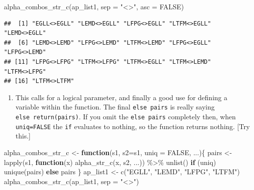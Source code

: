 \documentclass[
]{book}
\newenvironment{Shaded}{\begin{snugshade}}{\end{snugshade}}
\newcommand{\AttributeTok}[1]{\textcolor[rgb]{0.77,0.63,0.00}{#1}}
\newcommand{\ConstantTok}[1]{\textcolor[rgb]{0.00,0.00,0.00}{#1}}
\newcommand{\ControlFlowTok}[1]{\textcolor[rgb]{0.13,0.29,0.53}{\textbf{#1}}}
\newcommand{\FunctionTok}[1]{\textcolor[rgb]{0.00,0.00,0.00}{#1}}
\newcommand{\NormalTok}[1]{#1}
\newcommand{\OtherTok}[1]{\textcolor[rgb]{0.56,0.35,0.01}{#1}}
\newcommand{\SpecialCharTok}[1]{\textcolor[rgb]{0.00,0.00,0.00}{#1}}
\newcommand{\StringTok}[1]{\textcolor[rgb]{0.31,0.60,0.02}{#1}}
\providecommand{\tightlist}{%
  \setlength{\itemsep}{0pt}\setlength{\parskip}{0pt}}
\begin{document}
\begin{Shaded}
\begin{Highlighting}[]
\FunctionTok{alpha\_combos\_str\_c}\NormalTok{(ap\_list1, }\AttributeTok{sep =} \StringTok{"\textless{}\textgreater{}"}\NormalTok{, }\AttributeTok{asc =} \ConstantTok{FALSE}\NormalTok{)}
\end{Highlighting}
\end{Shaded}

\begin{verbatim}
##  [1] "EGLL<>EGLL" "LEMD<>EGLL" "LFPG<>EGLL" "LTFM<>EGLL" "LEMD<>EGLL"
##  [6] "LEMD<>LEMD" "LFPG<>LEMD" "LTFM<>LEMD" "LFPG<>EGLL" "LFPG<>LEMD"
## [11] "LFPG<>LFPG" "LTFM<>LFPG" "LTFM<>EGLL" "LTFM<>LEMD" "LTFM<>LFPG"
## [16] "LTFM<>LTFM"
\end{verbatim}

\begin{enumerate}
\def\labelenumi{\arabic{enumi})}
\setcounter{enumi}{8}
\tightlist
\item
  This calls for a logical parameter, and finally a good use for defining a variable within the function. The final \texttt{else\ pairs} is really saying \texttt{else\ return(pairs)}. If you omit the \texttt{else\ pairs} completely then, when \texttt{uniq=FALSE} the \texttt{if} evaluates to nothing, so the function returns nothing. {[}Try this.{]}
\end{enumerate}

\begin{Shaded}
\begin{Highlighting}[]
\NormalTok{alpha\_combos\_str\_c }\OtherTok{\textless{}{-}} \ControlFlowTok{function}\NormalTok{(s1, }\AttributeTok{s2=}\NormalTok{s1, }\AttributeTok{uniq =} \ConstantTok{FALSE}\NormalTok{, ...)\{}
\NormalTok{  pairs }\OtherTok{\textless{}{-}} \FunctionTok{lapply}\NormalTok{(s1, }\ControlFlowTok{function}\NormalTok{(x) }\FunctionTok{alpha\_str\_c}\NormalTok{(x, s2, ...)) }\SpecialCharTok{\%\textgreater{}\%} 
    \FunctionTok{unlist}\NormalTok{()}
  \ControlFlowTok{if}\NormalTok{ (uniq) }\FunctionTok{unique}\NormalTok{(pairs)}
  \ControlFlowTok{else}\NormalTok{ pairs}
\NormalTok{\}}
\NormalTok{ap\_list1 }\OtherTok{\textless{}{-}} \FunctionTok{c}\NormalTok{(}\StringTok{"EGLL"}\NormalTok{, }\StringTok{"LEMD"}\NormalTok{, }\StringTok{"LFPG"}\NormalTok{, }\StringTok{"LTFM"}\NormalTok{)}
\FunctionTok{alpha\_combos\_str\_c}\NormalTok{(ap\_list1, }\AttributeTok{sep =} \StringTok{"\textless{}\textgreater{}"}\NormalTok{)}
\end{Highlighting}
\end{Shaded}
\end{document}
